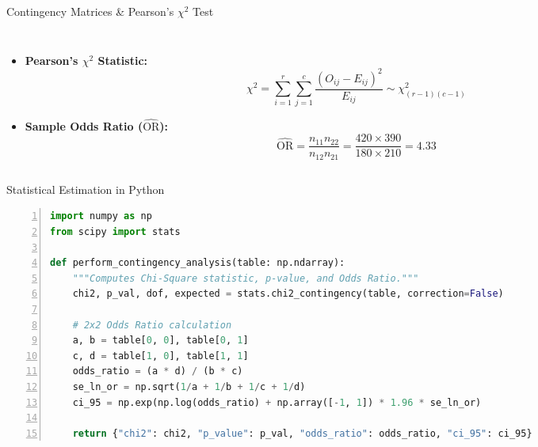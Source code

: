 \documentclass[aspectratio=169, 9pt]{beamer}
\begin{document}
\begin{frame}{Contingency Matrices \& Pearson's $\chi^2$ Test}
\begin{columns}[c]
\begin{column}{0.46\textwidth}
\begin{itemize}
\begin{equation*}
                \end{equation*}
                \item \textbf{Pearson's $\chi^2$ Statistic:}
                \begin{equation*}
                    \chi^2 = \sum_{i=1}^r \sum_{j=1}^c \frac{(O_{ij} - E_{ij})^2}{E_{ij}} \sim \chi^2_{(r-1)(c-1)}
                \end{equation*}
                \item \textbf{Sample Odds Ratio ($\widehat{\mathrm{OR}}$):}
                \begin{equation*}
                    \widehat{\mathrm{OR}} = \frac{n_{11} n_{22}}{n_{12} n_{21}} = \frac{420 \times 390}{180 \times 210} = 4.33
                \end{equation*}
            \end{itemize}
        \end{column}
    \end{columns}
\end{frame}

\begin{frame}[fragile]{Statistical Estimation in Python}
\begin{lstlisting}[language=Python, basicstyle=\ttfamily\scriptsize, keywordstyle=\color{accent}\bfseries, commentstyle=\color{structure!60}\itshape, stringstyle=\color{journalblue}, frame=single, rulecolor=\color{structure!20}, backgroundcolor=\color{structure!3}, numbers=left, numberstyle=\tiny\color{structure!50}]
import numpy as np
from scipy import stats

def perform_contingency_analysis(table: np.ndarray):
    """Computes Chi-Square statistic, p-value, and Odds Ratio."""
    chi2, p_val, dof, expected = stats.chi2_contingency(table, correction=False)
    
    # 2x2 Odds Ratio calculation
    a, b = table[0, 0], table[0, 1]
    c, d = table[1, 0], table[1, 1]
    odds_ratio = (a * d) / (b * c)
    se_ln_or = np.sqrt(1/a + 1/b + 1/c + 1/d)
    ci_95 = np.exp(np.log(odds_ratio) + np.array([-1, 1]) * 1.96 * se_ln_or)
    
    return {"chi2": chi2, "p_value": p_val, "odds_ratio": odds_ratio, "ci_95": ci_95}
\end{lstlisting}
\end{frame}

\end{document}
